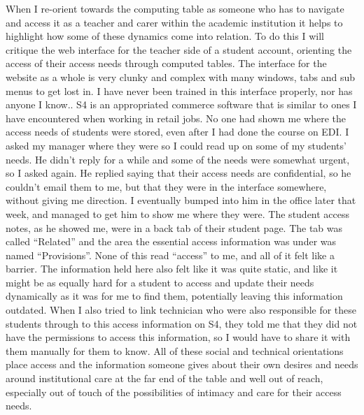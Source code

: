 When I re-orient towards the computing table as someone who has to
navigate and access it as a teacher and carer within the academic
institution it helps to highlight how some of these dynamics come into
relation. To do this I will critique the web interface for the teacher
side of a student account, orienting the access of their access needs
through computed tables. The interface for the website as a whole is
very clunky and complex with many windows, tabs and sub menus to get
lost in. I have never been trained in this interface properly, nor has
anyone I know.. S4 is an appropriated commerce software that is similar
to ones I have encountered when working in retail jobs. No one had shown
me where the access needs of students were stored, even after I had done
the course on EDI. I asked my manager where they were so I could read up
on some of my students' needs. He didn't reply for a while and some of
the needs were somewhat urgent, so I asked again. He replied saying that
their access needs are confidential, so he couldn't email them to me,
but that they were in the interface somewhere, without giving me
direction. I eventually bumped into him in the office later that week,
and managed to get him to show me where they were. The student access
notes, as he showed me, were in a back tab of their student page. The
tab was called ``Related'' and the area the essential access information
was under was named ``Provisions''. None of this read ``access'' to me,
and all of it felt like a barrier. The information held here also felt
like it was quite static, and like it might be as equally hard for a
student to access and update their needs dynamically as it was for me to
find them, potentially leaving this information outdated. When I also
tried to link technician who were also responsible for these students
through to this access information on S4, they told me that they did not
have the permissions to access this information, so I would have to
share it with them manually for them to know. All of these social and
technical orientations place access and the information someone gives
about their own desires and needs around institutional care at the far
end of the table and well out of reach, especially out of touch of the
possibilities of intimacy and care for their access needs.

